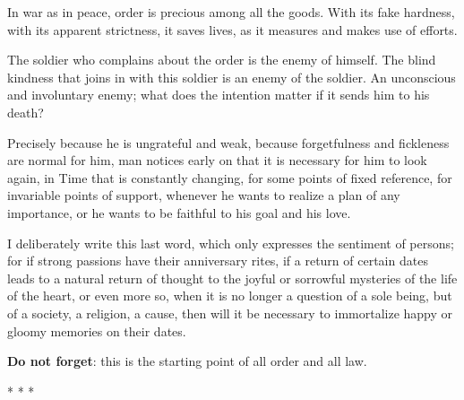 In war as in peace, order is precious among all the goods. With its fake hardness, with its apparent strictness, it saves lives, as it measures and makes use of efforts.

The soldier who complains about the order is the enemy of himself. The blind kindness that joins in with this soldier is an enemy of the soldier. An unconscious and involuntary enemy; what does the intention matter if it sends him to his death?

Precisely because he is ungrateful and weak, because forgetfulness and fickleness are normal for him, man notices early on that it is necessary for him to look again, in Time that is constantly changing, for some points of fixed reference, for invariable points of support, whenever he wants to realize a plan of any importance, or he wants to be faithful to his goal and his love.

I deliberately write this last word, which only expresses the sentiment of persons; for if strong passions have their anniversary rites, if a return of certain dates leads to a natural return of thought to the joyful or sorrowful mysteries of the life of the heart, or even more so, when it is no longer a question of a sole being, but of a society, a religion, a cause, then will it be necessary to immortalize happy or gloomy memories on their dates.

\textbf{Do not forget}: this is the starting point of all order and all law.




\begin{center}* * *\end{center}

